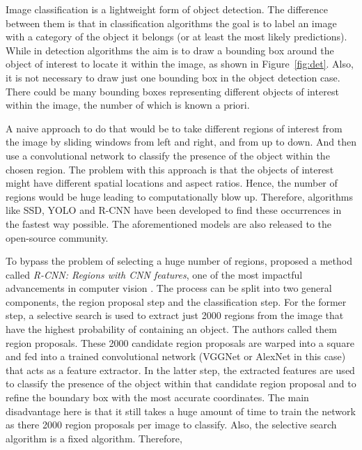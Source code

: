 \documentclass[12pt,a4paper,table,dvipsnames,tikz]{report}
\newcommand{\term}{\textit}
\newcommand{\acronym}{\MakeUppercase}
\newcommand{\bl}[1]{{\hypersetup{linkcolor=blue}#1}}
\begin{document}
	Image classification is a lightweight form of object detection. The difference between 
	them is that in classification algorithms the goal is to label an image with a category 
	of the object it belongs (or at least the most likely predictions). While in detection 
	algorithms the aim is to draw a bounding box around the object of interest to locate it 
	within the image, as shown in Figure~\bl{\ref{fig:det}}. Also, it is not necessary to draw 
	just one bounding box in the object detection case. There could be many bounding boxes 
	representing different objects of interest within the image, the number of which is 
	known a priori.
	\par
	A naive approach to do that would be to take different regions of interest from the 
	image by sliding windows from left and right, and from up to down. And then use a 
	convolutional network to classify the presence of the object within the chosen region. 
	The problem with this approach is that the objects of interest might have different 
	spatial locations and aspect ratios. Hence, the number of regions would be huge leading 
	to computationally blow up. Therefore, algorithms like \acronym{ssd}, \acronym{yolo} 
	and \acronym{r-cnn} \citep{Girshick, Redmon, Liu} have been developed to find these 
	occurrences in the fastest way possible. The aforementioned models are also released 
	to the open-source community.
	\par
	To bypass the problem of selecting a huge number of regions, \citet{Girshick} proposed 
	a method called \term{\acronym{r-cnn}: Regions with \acronym{cnn} features}, one of the 
	most impactful advancements in computer vision \citep{Deshpande}. The process can be 
	split into two general components, the region proposal step and the classification step. 
	For the former step, a selective search \citep{Uijlings} is used to extract just 2000 
	regions from the image that have the highest probability of containing an object. The 
	authors called them region proposals. These 2000 candidate region proposals are warped 
	into a square and fed into a trained convolutional network (VGGNet or AlexNet in this case) 
	that acts as a feature extractor. In the latter step, the extracted features are used to 
	classify the presence of the object within that candidate region proposal and to refine 
	the boundary box with the most accurate coordinates. The main disadvantage here is that 
	it still takes a huge amount of time to train the network as there 2000 region proposals 
	per image to classify. Also, the selective search algorithm is a fixed algorithm. Therefore, 
\end{document}
